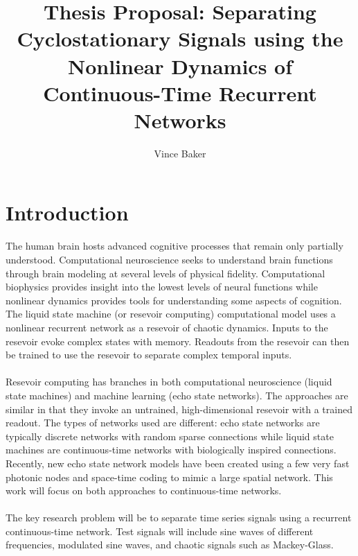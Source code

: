 \documentclass[a4paper,11pt]{article}
\title{Thesis Proposal: Separating Cyclostationary Signals using the Nonlinear Dynamics of Continuous-Time Recurrent Networks}
\author{Vince Baker}
\numberwithin{equation}{section}
\begin{document}
\maketitle

\section{Introduction} 
The human brain hosts advanced cognitive processes that remain only partially understood.
Computational neuroscience seeks to understand brain functions through brain modeling at several levels of physical fidelity.
Computational biophysics provides insight into the lowest levels of neural functions while nonlinear dynamics provides tools for understanding some aspects of cognition.
The liquid state machine (or resevoir computing) computational model uses a nonlinear recurrent network as a resevoir of chaotic dynamics.
Inputs to the resevoir evoke complex states with memory.
Readouts from the resevoir can then be trained to use the resevoir to separate complex temporal inputs.
\\ \\
Resevoir computing has branches in both computational neuroscience (liquid state machines) and machine learning (echo state networks).
The approaches are similar in that they invoke an untrained, high-dimensional resevoir with a trained readout.
The types of networks used are different: echo state networks are typically discrete networks with random sparse connections while liquid state machines are continuous-time networks with biologically inspired connections.
Recently, new echo state network models have been created using a few very fast photonic nodes and space-time coding to mimic a large spatial network.
This work will focus on both approaches to continuous-time networks.
\\ \\
The key research problem will be to separate time series signals using a recurrent continuous-time network. 
Test signals will include sine waves of different frequencies, modulated sine waves, and chaotic signals such as Mackey-Glass.
\end{document}
